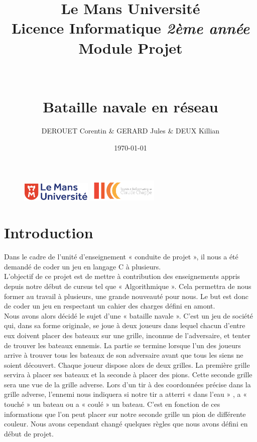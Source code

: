 \documentclass[a4paper,12pt]{article}
\begin{document}
\begin {figure}
\includegraphics[width=0.3\textwidth]{logolemansU.png}
\hspace{150pt} 
\includegraphics[width=0.3\textwidth] {logo_ic2.png}
\end {figure}
\title {\textbf {\color {blue} Le Mans Université}\color{black}
\\  Licence Informatique  \textit {2ème année}
 \\Module Projet
 \\\\\\ \textbf {Bataille navale en réseau}}
\author{DEROUET Corentin & GERARD Jules & DEUX Killian}

\date{\today} 
\maketitle \newpage
\newpage
\tableofcontents
\newpage


 
\section {Introduction}
 	Dans le cadre de l'unité d'enseignement « conduite de projet », il nous a été demandé de coder un jeu en langage C à plusieurs. \vspace{2\baselineskip}\\
    L'objectif de ce projet est de mettre à contribution des enseignements appris depuis notre début de cursus tel que « Algorithmique ». Cela permettra de nous former au travail à plusieurs, une grande nouveauté pour nous. Le but est donc de coder un jeu en respectant un cahier des charges défini en amont.\\
    Nous avons alors décidé le sujet d’une « bataille navale ». C'est un jeu de société qui, dans sa forme originale, se joue à deux joueurs dans lequel chacun d'entre eux doivent placer des bateaux sur une grille, inconnue de l'adversaire, et tenter de trouver les bateaux ennemis. La partie se termine lorsque l'un des joueurs arrive à trouver tous les bateaux de son adversaire avant que tous les siens ne soient découvert. Chaque joueur dispose alors de deux grilles. La première grille servira à placer ses bateaux et la seconde à placer des pions. Cette seconde grille sera une vue de la grille adverse. Lors d'un tir à des coordonnées précise dans la grille adverse, l'ennemi nous indiquera si notre tir a atterri « dans l'eau » , a « touché » un bateau ou a « coulé » un bateau. C'est en fonction de ces informations que l'on peut placer sur notre seconde grille un pion de différente couleur. Nous avons cependant changé quelques règles que nous avons défini en début de projet. \\
 
\end{document}
